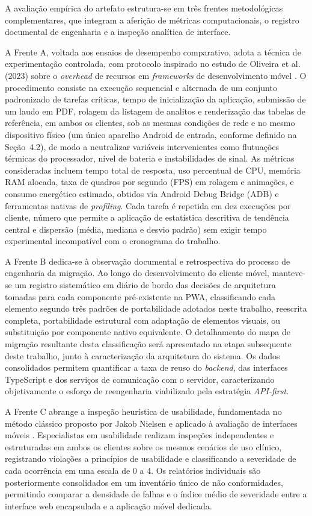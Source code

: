 \documentclass[12pt]{article}
\begin{document}
A avaliação empírica do artefato estrutura-se em três frentes metodológicas complementares, que integram a aferição de métricas computacionais, o registro documental de engenharia e a inspeção analítica de interface.

A Frente A, voltada aos ensaios de desempenho comparativo, adota a técnica de experimentação controlada, com protocolo inspirado no estudo de Oliveira et al. (2023) sobre o \emph{overhead} de recursos em \emph{frameworks} de desenvolvimento móvel \cite{oliveira2023}. O procedimento consiste na execução sequencial e alternada de um conjunto padronizado de tarefas críticas, tempo de inicialização da aplicação, submissão de um laudo em PDF, rolagem da listagem de analitos e renderização das tabelas de referência, em ambos os clientes, sob as mesmas condições de rede e no mesmo dispositivo físico (um único aparelho Android de entrada, conforme definido na Seção~4.2), de modo a neutralizar variáveis intervenientes como flutuações térmicas do processador, nível de bateria e instabilidades de sinal. As métricas consideradas incluem tempo total de resposta, uso percentual de CPU, memória RAM alocada, taxa de quadros por segundo (FPS) em rolagem e animações, e consumo energético estimado, obtidos via Android Debug Bridge (ADB) e ferramentas nativas de \emph{profiling}. Cada tarefa é repetida em dez execuções por cliente, número que permite a aplicação de estatística descritiva de tendência central e dispersão (média, mediana e desvio padrão) sem exigir tempo experimental incompatível com o cronograma do trabalho.

A Frente B dedica-se à observação documental e retrospectiva do processo de engenharia da migração. Ao longo do desenvolvimento do cliente móvel, manteve-se um registro sistemático em diário de bordo das decisões de arquitetura tomadas para cada componente pré-existente na PWA, classificando cada elemento segundo três padrões de portabilidade adotados neste trabalho, reescrita completa, portabilidade estrutural com adaptação de elementos visuais, ou substituição por componente nativo equivalente. O detalhamento do mapa de migração resultante desta classificação será apresentado na etapa subsequente deste trabalho, junto à caracterização da arquitetura do sistema. Os dados consolidados permitem quantificar a taxa de reuso do \emph{backend}, das interfaces TypeScript e dos serviços de comunicação com o servidor, caracterizando objetivamente o esforço de reengenharia viabilizado pela estratégia \emph{API-first}.

A Frente C abrange a inspeção heurística de usabilidade, fundamentada no método clássico proposto por Jakob Nielsen e aplicado à avaliação de interfaces móveis \cite{cardieri2018, nielsen1994}. Especialistas em usabilidade realizam inspeções independentes e estruturadas em ambos os clientes sobre os mesmos cenários de uso clínico, registrando violações a princípios de usabilidade e classificando a severidade de cada ocorrência em uma escala de 0 a 4. Os relatórios individuais são posteriormente consolidados em um inventário único de não conformidades, permitindo comparar a densidade de falhas e o índice médio de severidade entre a interface web encapsulada e a aplicação móvel dedicada.
\end{document}
